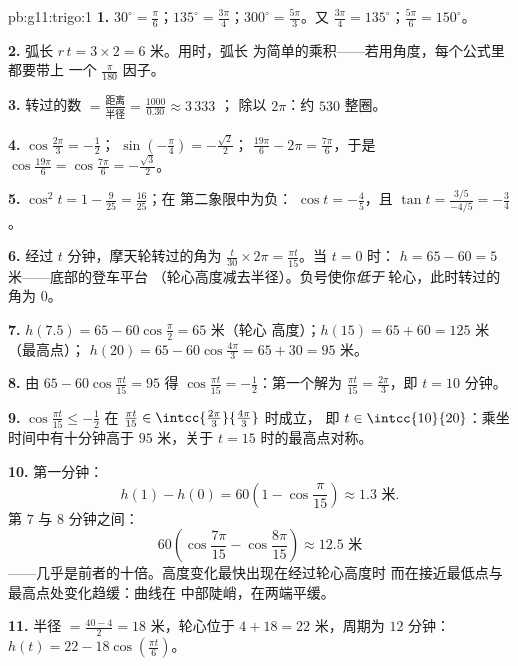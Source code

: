 \begin{solution}{pb:g11:trigo:1}
\textbf{1.} $30^\circ = \frac{\pi}{6}$；$135^\circ =
\frac{3\pi}{4}$；$300^\circ = \frac{5\pi}{3}$。又
$\frac{3\pi}{4} = 135^\circ$；$\frac{5\pi}{6} = 150^\circ$。

\textbf{2.} 弧长 $r\,t = 3 \times 2 = 6$ 米。用时，弧长
为简单的乘积——若用角度，每个公式里都要带上
一个 $\frac{\pi}{180}$ 因子。

\textbf{3.} 转过的数 $= \frac{\text{距离}}
{\text{半径}} = \frac{1000}{0.30} \approx 3\,333$ ；
除以 $2\pi$：约 $530$ 整圈。

\textbf{4.} $\cos\frac{2\pi}{3} = -\frac12$；
$\sin\left(-\frac\pi4\right) = -\frac{\sqrt2}{2}$；
$\frac{19\pi}{6} - 2\pi = \frac{7\pi}{6}$，于是
$\cos\frac{19\pi}{6} = \cos\frac{7\pi}{6} =
-\frac{\sqrt3}{2}$。

\textbf{5.} $\cos^2 t = 1 - \frac{9}{25} = \frac{16}{25}$；在
第二象限中为负：
$\cos t = -\frac45$，且
$\tan t = \frac{3/5}{-4/5} = -\frac34$。

\textbf{6.} 经过 $t$ 分钟，摩天轮转过的角为
$\frac{t}{30} \times 2\pi = \frac{\pi t}{15}$。当 $t = 0$ 时：
$h = 65 - 60 = 5$ 米——底部的登车平台
（轮心高度减去半径）。负号使你\emph{低于}
轮心，此时转过的角为 $0$。

\textbf{7.} $h(7.5) = 65 - 60\cos\frac{\pi}{2} = 65$ 米（轮心
高度）；$h(15) = 65 + 60 = 125$ 米（最高点）；
$h(20) = 65 - 60\cos\frac{4\pi}{3} = 65 + 30 = 95$ 米。

\textbf{8.} 由 $65 - 60\cos\frac{\pi t}{15} = 95$ 得
$\cos\frac{\pi t}{15} = -\frac12$：第一个解为
$\frac{\pi t}{15} = \frac{2\pi}{3}$，即 $t = 10$ 分钟。

\textbf{9.} $\cos\frac{\pi t}{15} \leq -\frac12$ 在
$\frac{\pi t}{15} \in \intcc{\frac{2\pi}{3}}{\frac{4\pi}{3}}$ 时成立，
即 $t \in \intcc{10}{20}$：乘坐时间中有十分钟高于
$95$ 米，关于 $t = 15$ 时的最高点对称。

\textbf{10.} 第一分钟：
\[
h(1) - h(0) = 60\left(1 - \cos\frac{\pi}{15}\right)
\approx 1.3 \text{ 米}.
\]
第 $7$ 与 $8$ 分钟之间：
\[
60\left(\cos\frac{7\pi}{15} - \cos\frac{8\pi}{15}\right)
\approx 12.5 \text{ 米}
\]
——几乎是前者的十倍。高度变化最快出现在经过轮心高度时
而在接近最低点与最高点处变化趋缓：曲线在
中部陡峭，在两端平缓。

\textbf{11.} 半径 $= \frac{40 - 4}{2} = 18$ 米，轮心位于
$4 + 18 = 22$ 米，周期为 $12$ 分钟：
$h(t) = 22 - 18\cos\left(\frac{\pi t}{6}\right)$。


\end{solution}
